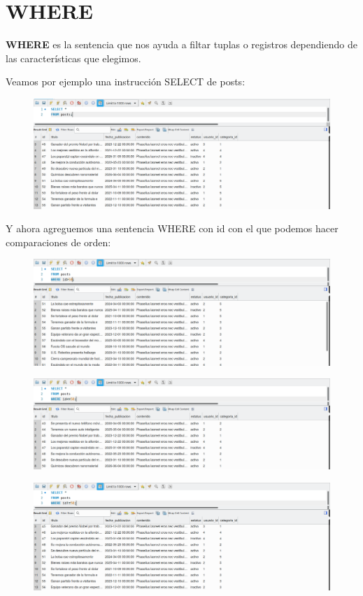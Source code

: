 \documentclass{article}
\begin{document}
\section{WHERE}%
\textbf{WHERE} es la sentencia que nos ayuda a filtar tuplas o registros
dependiendo de las características que elegimos.

Veamos por ejemplo una instrucción SELECT de posts:
\begin{figure}[h!]
  \centering
  \includegraphics[scale=0.75]{./Pictures/102_where.png}
\end{figure}

Y ahora agreguemos una sentencia WHERE con id con el que podemos hacer comparaciones de orden:
\begin{figure}[h!]
  \centering
  \includegraphics[scale=0.75]{./Pictures/103_where.png}
\end{figure}

\begin{figure}[h!]
  \centering
  \includegraphics[scale=0.75]{./Pictures/104_where.png}
\end{figure}

\begin{figure}[h!]
  \centering
  \includegraphics[scale=0.75]{./Pictures/107_where_id_dif.png}
\end{figure}
\end{document}
